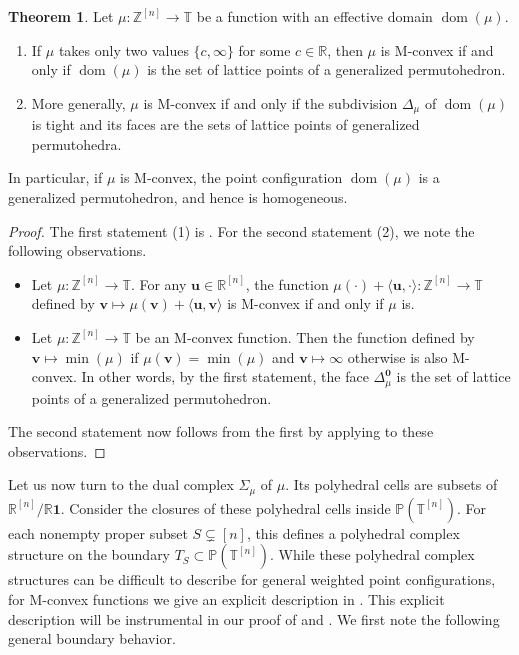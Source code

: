 \documentclass[11pt]{amsart}
\newcommand{\RR}{\mathbb R}
\newcommand{\PP}{\mathbb P}
\newcommand{\ZZ}{\mathbb Z}
\newcommand{\TT}{\mathbb T}
\newcommand{\bv}{{\mathbf v}}
\newcommand{\bu}{{\mathbf u}}
\theoremstyle{definition}
\newtheorem{thm}{Theorem}[subsection]
\begin{document}
\begin{thm}\label{thm:Mconvex}
Let $\mu: \ZZ^{[n]} \to {\TT}$ be a function with an effective domain $\operatorname{dom}(\mu)$.
\begin{enumerate}
\item If $\mu$ takes only two values $\{c,\infty\}$ for some $c\in \RR$, then $\mu$ is M-convex if and only if $\operatorname{dom}(\mu)$ is the set of lattice points of a generalized permutohedron.
\item More generally, $\mu$ is M-convex if and only if the subdivision $\Delta_\mu$ of $\operatorname{dom}(\mu)$ is tight and its faces are the sets of lattice points of generalized permutohedra.
\end{enumerate}
In particular, if $\mu$ is M-convex, the point configuration $\operatorname{dom}(\mu)$ is a generalized permutohedron, and hence is homogeneous.
\end{thm}

\begin{proof}
The first statement (1) is \cite[Theorem 4.15]{Mur03}.  For the second statement (2), we note the following observations.
\begin{itemize}
\item Let $\mu: \ZZ^{[n]} \to \TT$.  For any $\bu \in \RR^{[n]}$, the function $\mu(\cdot) + \langle \bu, \cdot \rangle: \ZZ^{[n]} \to \TT$ defined by $\bv \mapsto \mu(\bv) + \langle \bu, \bv \rangle$ is M-convex if and only if $\mu$ is.
\item Let $\mu: \ZZ^{[n]} \to \TT$ be an M-convex function.  Then the function defined by
$\bv \mapsto \min(\mu)$ if $\mu(\bv) = \min(\mu)$ and $\bv \mapsto 
\infty$ otherwise
is also M-convex.  In other words, by the first statement, the face $\Delta_\mu^{\mathbf 0}$ is the set of lattice points of a generalized permutohedron.
\end{itemize}
The second statement now follows from the first by applying  to these observations.
\end{proof}

Let us now turn to the dual complex $\Sigma_\mu$ of $\mu$.  Its polyhedral cells are subsets of $\RR^{[n]}/\RR\mathbf 1$.  Consider the closures of these polyhedral cells inside $\PP(\TT^{[n]})$.  For each nonempty proper subset $S\subsetneq [n]$, this defines a polyhedral complex structure on the boundary $T_S \subset \PP(\TT^{[n]})$.  While these polyhedral complex structures can be difficult to describe for general weighted point configurations, for M-convex functions we give an explicit description in .  This explicit description will be instrumental in our proof of  and .  We first note the following general boundary behavior.
\end{document}
